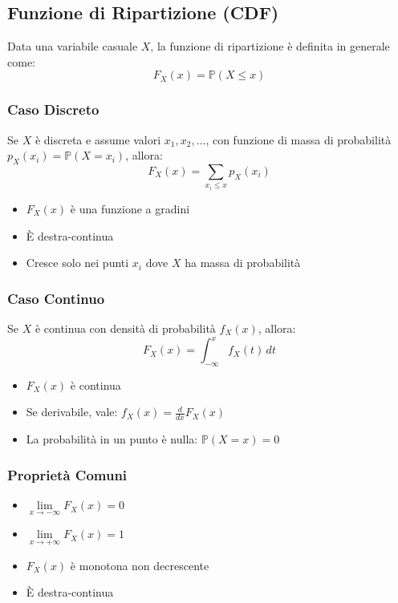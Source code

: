 \documentclass{article}
\begin{document}
\subsection*{Funzione di Ripartizione (CDF)}

Data una variabile casuale $X$, la funzione di ripartizione è definita in generale come:
\[
F_X(x) = \mathbb{P}(X \leq x)
\]

\subsubsection*{Caso Discreto}
Se $X$ è discreta e assume valori $x_1, x_2, \dots$, con funzione di massa di probabilità $p_X(x_i) = \mathbb{P}(X = x_i)$, allora:
\[
F_X(x) = \sum_{x_i \leq x} p_X(x_i)
\]

\begin{itemize}
  \item $F_X(x)$ è una funzione a gradini
  \item È destra-continua
  \item Cresce solo nei punti $x_i$ dove $X$ ha massa di probabilità
\end{itemize}

\subsubsection*{Caso Continuo}
Se $X$ è continua con densità di probabilità $f_X(x)$, allora:
\[
F_X(x) = \int_{-\infty}^{x} f_X(t) \, dt
\]

\begin{itemize}
  \item $F_X(x)$ è continua
  \item Se derivabile, vale: $f_X(x) = \frac{d}{dx}F_X(x)$
  \item La probabilità in un punto è nulla: $\mathbb{P}(X = x) = 0$
\end{itemize}

\subsubsection*{Proprietà Comuni}
\begin{itemize}
  \item $\lim\limits_{x \to -\infty} F_X(x) = 0$
  \item $\lim\limits_{x \to +\infty} F_X(x) = 1$
  \item $F_X(x)$ è monotona non decrescente
  \item È destra-continua
\end{itemize}
\end{document}
